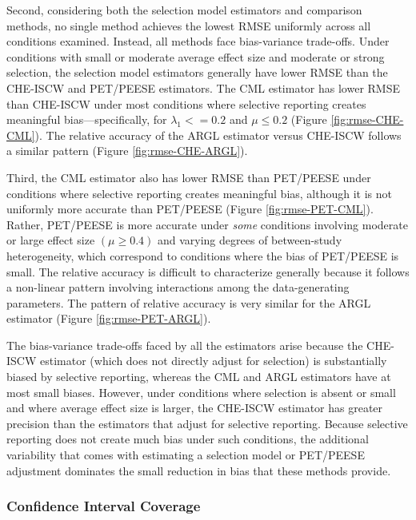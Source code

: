 \documentclass[
  american,
  man, donotrepeattitle,floatsintext]{apa7}
\begin{document}
Second, considering both the selection model estimators and comparison methods, no single method achieves the lowest RMSE uniformly across all conditions examined.
Instead, all methods face bias-variance trade-offs.
Under conditions with small or moderate average effect size and moderate or strong selection, the selection model estimators generally have lower RMSE than the CHE-ISCW and PET/PEESE estimators.
The CML estimator has lower RMSE than CHE-ISCW under most conditions where selective reporting creates meaningful bias---specifically, for \(\lambda_1 <= 0.2\) and \(\mu \leq 0.2\) (Figure \ref{fig:rmse-CHE-CML}).
The relative accuracy of the ARGL estimator versus CHE-ISCW follows a similar pattern (Figure \ref{fig:rmse-CHE-ARGL}).

Third, the CML estimator also has lower RMSE than PET/PEESE under conditions where selective reporting creates meaningful bias, although it is not uniformly more accurate than PET/PEESE (Figure \ref{fig:rmse-PET-CML}).
Rather, PET/PEESE is more accurate under \emph{some} conditions involving moderate or large effect size \((\mu \geq 0.4)\) and varying degrees of between-study heterogeneity,
which correspond to conditions where the bias of PET/PEESE is small.
The relative accuracy is difficult to characterize generally because it follows a non-linear pattern involving interactions among the data-generating parameters.
The pattern of relative accuracy is very similar for the ARGL estimator (Figure \ref{fig:rmse-PET-ARGL}).

The bias-variance trade-offs faced by all the estimators arise because the CHE-ISCW estimator (which does not directly adjust for selection) is substantially biased by selective reporting, whereas the CML and ARGL estimators have at most small biases.
However, under conditions where selection is absent or small and where average effect size is larger, the CHE-ISCW estimator has greater precision than the estimators that adjust for selective reporting.
Because selective reporting does not create much bias under such conditions, the additional variability that comes with estimating a selection model or PET/PEESE adjustment dominates the small reduction in bias that these methods provide.

\subsubsection{Confidence Interval Coverage}\label{confidence-interval-coverage}
\end{document}
